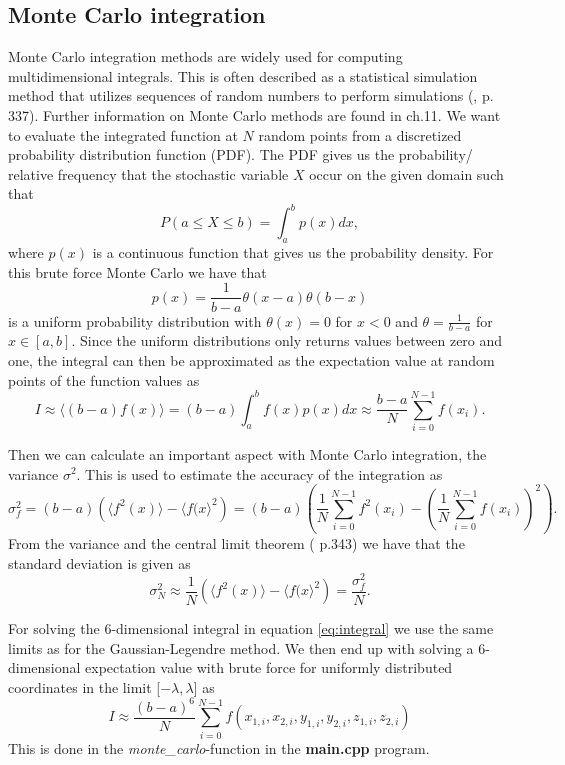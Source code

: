 \documentclass[12pt,a4paper,english]{article}
\begin{document}
\subsection{Monte Carlo integration}
Monte Carlo integration methods are widely used for computing multidimensional integrals. This is often described as a statistical simulation method that utilizes sequences of random numbers to perform simulations (\citet{lectures}, p. 337). Further information on Monte Carlo methods are found in \citet{lectures} ch.11. We want to evaluate the integrated function at $N$ random points from a discretized probability distribution function (PDF). The PDF gives us the probability/ relative frequency that the stochastic variable $X$ occur on the given domain such that \[P(a\leq X \leq b)=\int_{a}^{b}p(x)dx,\]
where $p(x)$ is a continuous function that gives us the probability density. For this brute force Monte Carlo we have that \[p(x)=\frac{1}{b-a}\theta(x-a)\theta(b-x)\] is a uniform probability distribution with $\theta(x)=0$ for $x<0$ and $\theta=\frac{1}{b-a}$ for $x\in[a,b]$. Since the uniform distributions only returns values between zero and one, the integral can then be approximated as the expectation value at random points of the function values as
\begin{equation*}
I\approx\langle (b-a)f(x) \rangle=(b-a)\int_{a}^{b}f(x)p(x)dx\approx \frac{b-a}{N}\sum_{i=0}^{N-1}f(x_i).
\end{equation*}

Then we can calculate an important aspect with Monte Carlo integration, the variance $\sigma^2$. This is used to estimate the accuracy of the integration as
\begin{equation}
\label{eq:variance}
\sigma_f^2 = (b-a)\left(\langle f^2(x)\rangle - \langle f(x\rangle^2\right) = (b-a) \left(\frac{1}{N}\sum_{i=0}^{N-1} f^2(x_i) - \left(\frac{1}{N}\sum_{i=0}^{N-1}f(x_i)\right)^2\right) .
\end{equation}
From the variance and the central limit theorem (\citet{lectures} p.343) we have that the standard deviation is given as 
\begin{equation*}
\sigma_N^2\approx \frac{1}{N}\left(\langle f^2(x)\rangle - \langle f(x\rangle^2\right)=\frac{\sigma_f^2}{N}.
\end{equation*}

For solving the 6-dimensional integral in equation \ref{eq:integral} we use the same limits as for the Gaussian-Legendre method. We then end up with solving a 6-dimensional expectation value with brute force for uniformly distributed coordinates in the limit [$-\lambda, \lambda$] as 
\begin{equation}
\label{eq:6dim_expect}
I\approx\frac{(b-a)^6}{N}\sum_{i=0}^{N-1}f(x_{1,i},x_{2,i},y_{1,i},y_{2,i},z_{1,i},z_{2,i})
\end{equation}
This is done in the \textit{monte\_carlo}-function in the \textbf{main.cpp} program.
\end{document}
